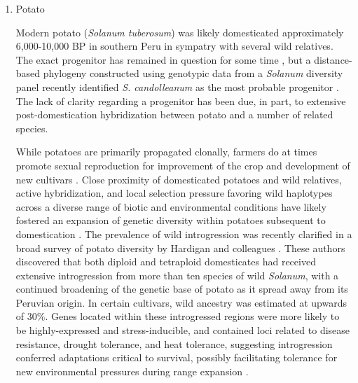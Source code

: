 \documentclass[11pt]{article}
\begin{document}
\begin{enumerate}


\item{Potato}

Modern potato (\emph{Solanum tuberosum}) was likely domesticated approximately 6,000-10,000 BP in southern Peru in sympatry with several wild relatives.
The exact progenitor has remained in question for some time \cite{spooner2005single, pickersgill1977origins, hawkes1988evolution}, but a distance-based phylogeny constructed using genotypic data from a \emph{Solanum} diversity panel recently identified \emph{S. candolleanum} as the most probable progenitor \cite{hardigan2015taxonomy}.
The lack of clarity regarding a progenitor has been due, in part, to extensive post-domestication hybridization between potato and a number of related species.

While potatoes are primarily propagated clonally, farmers do at times promote sexual reproduction for improvement of the crop and development of new cultivars \cite{quiros1992increase}.
Close proximity of domesticated potatoes and wild relatives, active hybridization, and local selection pressure favoring wild haplotypes across a diverse range of biotic and environmental conditions have likely fostered an expansion of genetic diversity within potatoes subsequent to domestication \cite{brush1995potato}.
The prevalence of wild introgression was recently clarified in a broad survey of potato diversity by Hardigan and colleagues \cite{hardigan2017genome}.
These authors discovered that both diploid and tetraploid domesticates had received extensive introgression from more than ten species of wild \emph{Solanum}, with a continued broadening of the genetic base of potato as it spread away from its Peruvian origin.
In certain cultivars, wild ancestry was estimated at upwards of 30\%.
Genes located within these introgressed regions were more likely to be highly-expressed and stress-inducible, and contained loci related to disease resistance, drought tolerance, and heat tolerance, suggesting introgression conferred adaptations critical to survival, possibly facilitating tolerance for new environmental pressures during range expansion \cite{hardigan2017genome}.
\end{enumerate}
\end{document}
